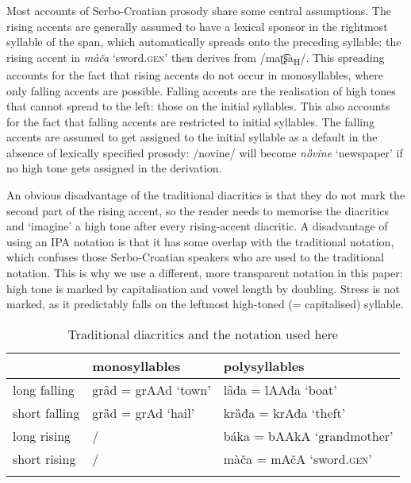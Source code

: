 \documentclass[output=paper]{langsci/langscibook}
\begin{document}
Most accounts of Serbo-Croatian prosody share some central assumptions. The rising accents are generally assumed to have a lexical sponsor in the rightmost syllable of the span, which automatically spreads onto the preceding syllable: the rising accent in \textit{màča} `sword.\textsc{gen}' then derives from /maʈ͡ʂa\textsubscript{H}/. This spreading accounts for the fact that rising accents do not occur in monosyllables, where only falling accents are possible. Falling accents are the realisation of high tones that cannot spread to the left: those on the initial syllables. This also accounts for the fact that falling accents are restricted to initial syllables. The falling accents are assumed to get assigned to the initial syllable as a default in the absence of lexically specified prosody: /novine/ will become \textit{nȍvine} `newspaper' if no high tone gets assigned in the derivation.  

An obvious disadvantage of the traditional diacritics is that they do not mark the second part of the rising accent, so the reader needs to memorise the diacritics and `imagine' a high tone after every rising-accent diacritic. A disadvantage of using an IPA notation is that it has some overlap with the traditional notation, which confuses those Serbo-Croatian speakers who are used to the traditional notation. This is why we use a different, more transparent notation in this paper: high tone is marked by capitalisation and vowel length by doubling. Stress is not marked, as it predictably falls on the leftmost high-toned (= capitalised) syllable.

\begin{table}
\caption{Traditional diacritics and the notation used here}
\label{tab1_p}
 \begin{tabular}{ l l l }
\lsptoprule & monosyllables & polysyllables\\ %
\midrule
long falling  &  grȃd = grAAd  `town' & lȃđa = lAAđa `boat'  \\
short falling  & grȁd = grAd  `hail' & krȁđa = krAđa `theft'	
 \\
long rising  &   /  &    báka = bAAkA `grandmother'\\
short rising  &  / &  màča = mAčA `sword.\textsc{gen}'\\
 \lspbottomrule
 \end{tabular}
\end{table}
\end{document}
